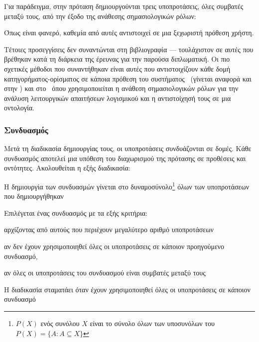 Για παράδειγμα, στην πρόταση  δημιουργούνται τρεις υποπροτάσεις, όλες συμβατές μεταξύ τους,
από την έξοδο της ανάθεσης σημασιολογικών ρόλων:
\begin{compactenum}
    \item {}
    \item {}
    \item {}
\end{compactenum}
Όπως είναι φανερό, καθεμία από αυτές αντιστοιχεί σε μια ξεχωριστή πρόθεση χρήστη.

Τέτοιες προσεγγίσεις δεν συναντώνται στη βιβλιογραφία --- τουλάχιστον σε αυτές που βρέθηκαν κατά τη διάρκεια της έρευνας για την παρούσα διπλωματική.
Οι πιο σχετικές μέθοδοι που συναντήθηκαν είναι αυτές που αντιστοιχίζουν κάθε δομή κατηγορήματος-ορίσματος σε κάποια πρόθεση του συστήματος~\cite{tur2005semi,hakkani2015clustering}
(γίνεται αναφορά και στην )
και στο~\cite{diamantopoulos2017software} όπου χρησιμοποιείται η ανάθεση σημασιολογικών ρόλων για την ανάλυση λειτουργικών απαιτήσεων λογισμικού και η αντιστοίχησή τους σε μια οντολογία.

\subsubsection{Συνδυασμός}\label{subsec:4-subsentence-combine}
Μετά τη διαδικασία δημιουργίας τους, οι υποπροτάσεις συνδυάζονται σε δομές.
Κάθε συνδυασμός αποτελεί μια υπόθεση του διαχωρισμού της πρότασης σε προθέσεις και οντότητες.
Ακολουθείται η εξής διαδικασία:
\begin{compactenum}
    \item Η δημιουργία των συνδυασμών γίνεται στο δυναμοσύνολο\footnote{ $P(X)$ ενός συνόλου $X$ είναι το σύνολο όλων των υποσυνόλων του $P(X) = \{A: A \subseteq X\}$}
          όλων των υποπροτάσεων που δημιουργήθηκαν
    \item Επιλέγεται ένας συνδυασμός με τα εξής κριτήρια:
          \begin{compactenum}
              \item αρχίζοντας από αυτούς που περιέχουν μεγαλύτερο αριθμό υποπροτάσεων
              \item αν δεν έχουν χρησιμοποιηθεί όλες οι υποπροτάσεις σε κάποιον προηγούμενο συνδυασμό,
              \item αν όλες οι υποπροτάσεις του συνδυασμού είναι συμβατές μεταξύ τους
          \end{compactenum}
    \item Η διαδικασία σταματάει όταν έχουν χρησιμοποιηθεί όλες οι υποπροτάσεις σε κάποιον συνδυασμό
\end{compactenum}

